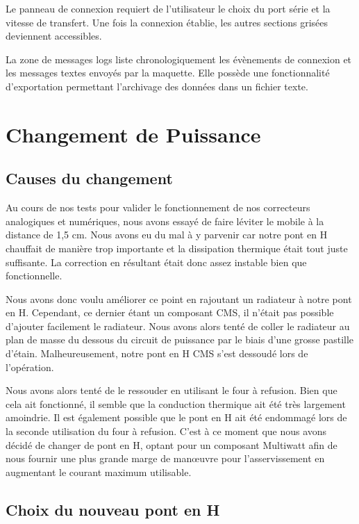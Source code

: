 \documentclass[11pt, french]{article} %
\begin{document}
Le panneau de connexion requiert de l'utilisateur le choix du port série et la vitesse de transfert. Une fois la connexion établie, les autres sections grisées deviennent accessibles. 

La zone de messages logs liste chronologiquement les évènements de connexion et les messages textes envoyés par la maquette. Elle possède une fonctionnalité d'exportation permettant l'archivage des données dans un fichier texte.

\section{Changement de Puissance}

\subsection{Causes du changement}
Au cours de nos tests pour valider le fonctionnement de nos correcteurs analogiques et numériques, nous avons essayé de faire léviter le mobile à la distance de 1,5 cm. Nous avons eu du mal à y parvenir car notre pont en H chauffait de manière trop importante et la dissipation thermique était tout juste suffisante. La correction en résultant était donc assez instable bien que fonctionnelle. 

Nous avons donc voulu améliorer ce point en rajoutant un radiateur à notre pont en H. Cependant, ce dernier étant un composant CMS, il n'était pas possible d'ajouter facilement le radiateur. Nous avons alors tenté de coller le radiateur au plan de masse du dessous du circuit de puissance par le biais d'une grosse pastille d'étain. Malheureusement, notre pont en H CMS s'est dessoudé lors de l'opération.

Nous avons alors tenté de le ressouder en utilisant le four à refusion. Bien que cela ait fonctionné, il semble que la conduction thermique ait été très largement amoindrie. Il est également possible que le pont en H ait été endommagé lors de la seconde utilisation du four à refusion. C'est à ce moment que nous avons décidé de changer de pont en H, optant pour un composant Multiwatt afin de nous fournir une plus grande marge de manœuvre pour l'asservissement en augmentant le courant maximum utilisable. 

\subsection{Choix du nouveau pont en H}
\end{document}
